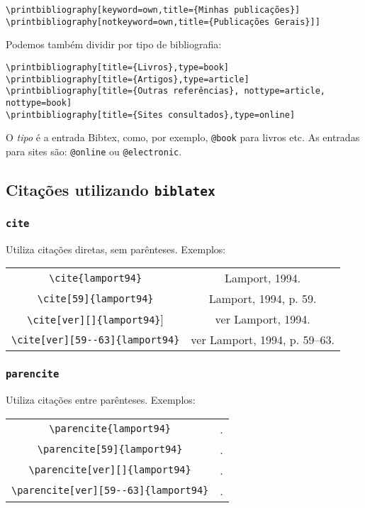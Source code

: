 \begin{verbatim}
\printbibliography[keyword=own,title={Minhas publicações}]
\printbibliography[notkeyword=own,title={Publicações Gerais}]]
\end{verbatim}

Podemos também dividir por tipo de bibliografia:

\begin{verbatim}
\printbibliography[title={Livros},type=book]
\printbibliography[title={Artigos},type=article]
\printbibliography[title={Outras referências}, nottype=article, nottype=book]
\printbibliography[title={Sites consultados},type=online]
\end{verbatim}

O \textit{tipo} é a entrada Bibtex, como, por exemplo, \verb+@book+ para livros etc. As entradas para sites são: \verb+@online+ ou \verb+@electronic+.

\subsection{Citações utilizando \texttt{biblatex}}

\subsubsection*{\texttt{cite}}
Utiliza citações diretas, sem parênteses. Exemplos:


\begin{tabular}{cc}
\centering
\verb+\cite{lamport94}+ &  Lamport, 1994.\\

\verb+\cite[59]{lamport94}+ & Lamport, 1994, p. 59.\\

\verb+\cite[ver][]{lamport94}+] & ver Lamport, 1994.\\

\verb+\cite[ver][59--63]{lamport94}+ & ver Lamport, 1994, p. 59--63.\\
\end{tabular}

\subsubsection*{\texttt{parencite}}
Utiliza citações entre parênteses. Exemplos:


\begin{tabular}{cc}
\centering
\verb+\parencite{lamport94}+ & \parencite{lamport94}.\\

\verb+\parencite[59]{lamport94}+ & \parencite[59]{lamport94}.\\

\verb+\parencite[ver][]{lamport94}+ &  \parencite[ver][]{lamport94}.\\

\verb+\parencite[ver][59--63]{lamport94}+ &  \parencite[ver][59--63]{lamport94}.\\
\end{tabular}

